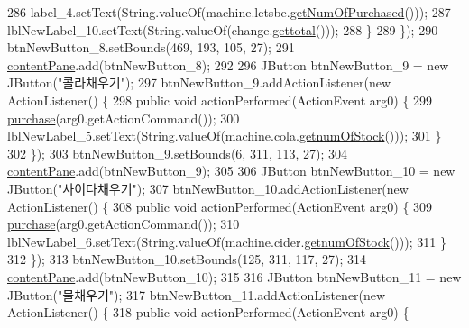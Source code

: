 \begin{DoxyCode}
286                 label\_4.setText(String.valueOf(machine.letsbe.\hyperlink{class_vending_machine_1_1_product_aefa8a5881c5569171a8cf1161b4bd911}{getNumOfPurchased}()));
287                 lblNewLabel\_10.setText(String.valueOf(change.\hyperlink{class_vending_machine_1_1_change_a07a32d7240178343fa1273d075d73c64}{gettotal}()));
288             \}
289         \});
290         btnNewButton\_8.setBounds(469, 193, 105, 27);
291         \hyperlink{class_vending_machine_1_1_machine_u_i_ac8ef25585e46da798d067af0eefa1a03}{contentPane}.add(btnNewButton\_8);
292     
296         JButton btnNewButton\_9 = \textcolor{keyword}{new} JButton(\textcolor{stringliteral}{"콜라채우기"});
297         btnNewButton\_9.addActionListener(\textcolor{keyword}{new} ActionListener() \{
298             \textcolor{keyword}{public} \textcolor{keywordtype}{void} actionPerformed(ActionEvent arg0) \{
299                 \hyperlink{class_vending_machine_1_1_machine_u_i_aadccf593dc69281c9ebbfe1fbe09b804}{purchase}(arg0.getActionCommand());
300                 lblNewLabel\_5.setText(String.valueOf(machine.cola.\hyperlink{class_vending_machine_1_1_product_a199bec8565bf69e9231248a49076a01b}{getnumOfStock}()));
301             \}
302         \});
303         btnNewButton\_9.setBounds(6, 311, 113, 27);
304         \hyperlink{class_vending_machine_1_1_machine_u_i_ac8ef25585e46da798d067af0eefa1a03}{contentPane}.add(btnNewButton\_9);
305         
306         JButton btnNewButton\_10 = \textcolor{keyword}{new} JButton(\textcolor{stringliteral}{"사이다채우기"});
307         btnNewButton\_10.addActionListener(\textcolor{keyword}{new} ActionListener() \{
308             \textcolor{keyword}{public} \textcolor{keywordtype}{void} actionPerformed(ActionEvent arg0) \{
309                 \hyperlink{class_vending_machine_1_1_machine_u_i_aadccf593dc69281c9ebbfe1fbe09b804}{purchase}(arg0.getActionCommand());
310                 lblNewLabel\_6.setText(String.valueOf(machine.cider.\hyperlink{class_vending_machine_1_1_product_a199bec8565bf69e9231248a49076a01b}{getnumOfStock}()));
311             \}
312         \});
313         btnNewButton\_10.setBounds(125, 311, 117, 27);
314         \hyperlink{class_vending_machine_1_1_machine_u_i_ac8ef25585e46da798d067af0eefa1a03}{contentPane}.add(btnNewButton\_10);
315         
316         JButton btnNewButton\_11 = \textcolor{keyword}{new} JButton(\textcolor{stringliteral}{"물채우기"});
317         btnNewButton\_11.addActionListener(\textcolor{keyword}{new} ActionListener() \{
318             \textcolor{keyword}{public} \textcolor{keywordtype}{void} actionPerformed(ActionEvent arg0) \{

\end{DoxyCode}
